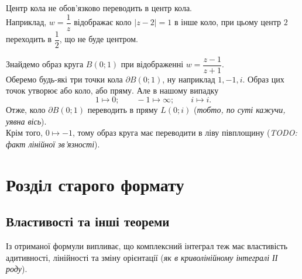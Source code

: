 \documentclass{math_library}
\begin{document}
\begin{remark}
Центр кола не обов'язково переводить в центр кола.
\bigskip \\
Наприклад, $w = \dfrac{1}{z}$ відображає коло $|z-2| = 1$ в інше коло, при цьому центр $2$ переходить в $\dfrac{1}{2}$, що не буде центром.
\end{remark}

\begin{example}
Знайдемо образ круга $B(0;1)$ при відображенні $w = \dfrac{z-1}{z+1}$.
\bigskip \\
Оберемо будь-які три точки кола $\partial B(0;1)$, ну наприклад $1,-1,i$. Образ цих точок утворює або коло, або пряму. Але в нашому випадку
\[
1 \mapsto 0; \qquad
-1 \mapsto \infty; \qquad
i \mapsto i.
\]
Отже, коло $\partial B(0;1)$ переводить в пряму $L(0;i)$ (\textit{тобто, по суті кажучи, уявна вісь}).\\
Крім того, $0 \mapsto -1$, тому образ круга має переводити в ліву півплощину (\textit{TODO: факт лінійної зв'язності}).
\begin{figure}[H]
\centering
{}
\qquad
\centering
{}
\end{figure}
\end{example}

\newpage
\section{Розділ старого формату}
\subsection{Властивості та інші теореми}
\begin{remark}
Із отриманої формули випливає, що комплексний інтеграл теж має властивість адитивності, лінійності та зміну орієнтації (\textit{як в криволінійному інтегралі ІІ роду}).
\end{remark}
\end{document}

